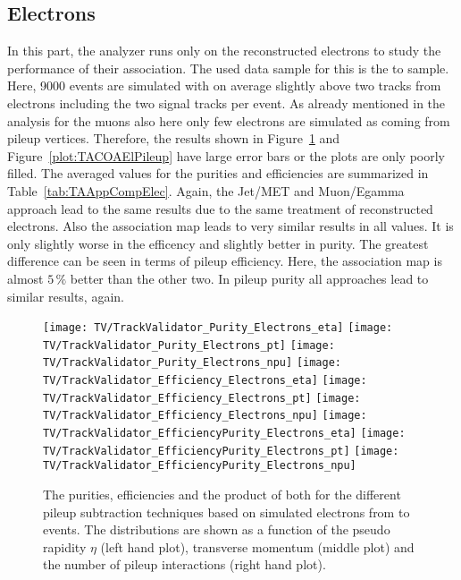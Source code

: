 

\subsection{Electrons \label{sec:TASEFRDAE} }

In this part, the analyzer runs only on the reconstructed electrons to study the performance of their association. The used data sample for this is the \Zz to \EE sample. Here, 9000 events are simulated with on average slightly above two tracks from electrons including the two signal tracks per event. As already mentioned in the analysis for the muons also here only few electrons are simulated as coming from pileup vertices. Therefore, the results shown in Figure~\ref{plot:TACOAElSignal} and Figure~\ref{plot:TACOAElPileup} have large error bars or the plots are only poorly filled. The averaged values for the purities and efficiencies are summarized in Table~\ref{tab:TAAppCompElec}. Again, the Jet/MET and Muon/Egamma approach lead to the same results due to the same treatment of reconstructed electrons. Also the association map leads to very similar results in all values. It is only slightly worse in the efficency and slightly better in purity. The greatest difference can be seen in terms of pileup efficiency. Here, the association map is almost $5\,\%$ better than the other two. In pileup purity all approaches lead to similar results, again.

\begin{figure}[h!t]
  \centering
  \texttt{[image: TV/TrackValidator\_Purity\_Electrons\_eta]}
  \texttt{[image: TV/TrackValidator\_Purity\_Electrons\_pt]}
  \texttt{[image: TV/TrackValidator\_Purity\_Electrons\_npu]}
  \newline
  \texttt{[image: TV/TrackValidator\_Efficiency\_Electrons\_eta]}
  \texttt{[image: TV/TrackValidator\_Efficiency\_Electrons\_pt]}
  \texttt{[image: TV/TrackValidator\_Efficiency\_Electrons\_npu]}
  \newline
  \texttt{[image: TV/TrackValidator\_EfficiencyPurity\_Electrons\_eta]}
  \texttt{[image: TV/TrackValidator\_EfficiencyPurity\_Electrons\_pt]}
  \texttt{[image: TV/TrackValidator\_EfficiencyPurity\_Electrons\_npu]}
  \caption[Purity, efficiency and their product for the different pileup subtraction techniques based on simulated electrons from \Zz to \EE events]{The purities, efficiencies and the product of both for the different pileup subtraction techniques based on simulated electrons from \Zz to \EE events. The distributions are shown as a function of the pseudo rapidity $\eta$ (left hand plot), transverse momentum (middle plot) and the number of pileup interactions (right hand plot). \label{plot:TACOAElSignal}}
\end{figure}

